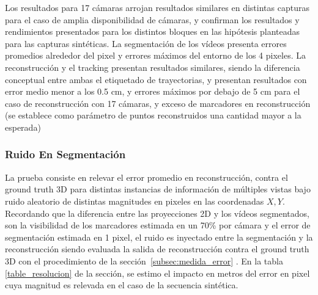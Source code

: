 Los resultados para 17 cámaras arrojan resultados similares en distintas capturas para el caso de amplia disponibilidad de cámaras, y confirman los resultados y rendimientos presentados para los distintos bloques en las hipótesis planteadas para las capturas sintéticas. La segmentación de los vídeos presenta errores promedios alrededor del pixel y errores máximos del entorno de los 4 pixeles. La reconstrucción y el tracking presentan resultados similares, siendo la diferencia conceptual entre ambas el etiquetado de trayectorias, y presentan resultados con error medio menor a los 0.5 cm, y errores máximos por debajo de 5 cm para el caso de reconstrucción con 17 cámaras, y exceso de marcadores en reconstrucción (se establece como parámetro de puntos reconstruidos una cantidad mayor a la esperada) 

\subsubsection{Ruido En Segmentación}

La prueba consiste en relevar el error promedio en reconstrucción, contra el ground truth 3D para distintas instancias de información de múltiples vistas bajo ruido aleatorio de distintas magnitudes en pixeles en las coordenadas $X,Y$. Recordando que la diferencia entre las proyecciones 2D y los vídeos segmentados, son la visibilidad de los marcadores estimada en un 70\% por cámara y el error de segmentación estimada en 1 pixel, el ruido es inyectado entre la segmentación y la reconstrucción siendo evaluada la salida de reconstrucción contra el ground truth 3D con el procedimiento de la sección~\ref{subsec:medida_error} . En la tabla \ref{table_resolucion} de la sección\label{seccion_Base_Datos_Sintetica}, se estimo el impacto en metros del error en pixel cuya magnitud es relevada en el caso de la secuencia sintética.

